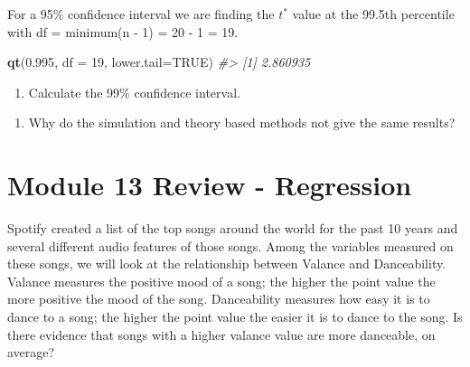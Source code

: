 \documentclass[
]{report}
\newenvironment{Shaded}{\begin{snugshade}}{\end{snugshade}}
\newcommand{\AttributeTok}[1]{\textcolor[rgb]{0.13,0.29,0.53}{#1}}
\newcommand{\CommentTok}[1]{\textcolor[rgb]{0.56,0.35,0.01}{\textit{#1}}}
\newcommand{\ConstantTok}[1]{\textcolor[rgb]{0.56,0.35,0.01}{#1}}
\newcommand{\DecValTok}[1]{\textcolor[rgb]{0.00,0.00,0.81}{#1}}
\newcommand{\FloatTok}[1]{\textcolor[rgb]{0.00,0.00,0.81}{#1}}
\newcommand{\FunctionTok}[1]{\textcolor[rgb]{0.13,0.29,0.53}{\textbf{#1}}}
\newcommand{\NormalTok}[1]{#1}
\providecommand{\tightlist}{%
  \setlength{\itemsep}{0pt}\setlength{\parskip}{0pt}}
\begin{document}
For a 95\% confidence interval we are finding the \(t^*\) value at the 99.5th percentile with df = minimum(n - 1) = 20 - 1 = 19.

\begin{Shaded}
\begin{Highlighting}[]
\FunctionTok{qt}\NormalTok{(}\FloatTok{0.995}\NormalTok{, }\AttributeTok{df =} \DecValTok{19}\NormalTok{, }\AttributeTok{lower.tail=}\ConstantTok{TRUE}\NormalTok{)}
\CommentTok{\#\textgreater{} [1] 2.860935}
\end{Highlighting}
\end{Shaded}

\begin{enumerate}
\def\labelenumi{\arabic{enumi}.}
\setcounter{enumi}{10}
\tightlist
\item
  Calculate the 99\% confidence interval.
\end{enumerate}

\vspace{0.5in}

\begin{enumerate}
\def\labelenumi{\arabic{enumi}.}
\setcounter{enumi}{11}
\tightlist
\item
  Why do the simulation and theory based methods not give the same results?
\end{enumerate}

\vspace{0.5in}

\section{Module 13 Review - Regression}\label{module-13-review---regression}

Spotify created a list of the top songs around the world for the past 10 years and several different audio features of those songs. Among the variables measured on these songs, we will look at the relationship between Valance and Danceability. Valance measures the positive mood of a song; the higher the point value the more positive the mood of the song. Danceability measures how easy it is to dance to a song; the higher the point value the easier it is to dance to the song. Is there evidence that songs with a higher valance value are more danceable, on average?
\end{document}
